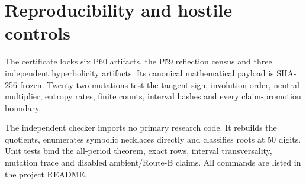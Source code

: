 \section{Reproducibility and hostile controls}

The certificate locks six P60 artifacts, the P59 reflection census and three
independent hyperbolicity artifacts.  Its canonical mathematical payload is
SHA-256 frozen.  Twenty-two mutations test the tangent sign, involution order,
neutral multiplier, entropy rates, finite counts, interval hashes and every
claim-promotion boundary.

The independent checker imports no primary research code.  It rebuilds the
quotients, enumerates symbolic necklaces directly and classifies roots at
50 digits.  Unit tests bind the all-period theorem, exact rows, interval
transversality, mutation trace and disabled ambient/Route-B claims.  All
commands are listed in the project README.
